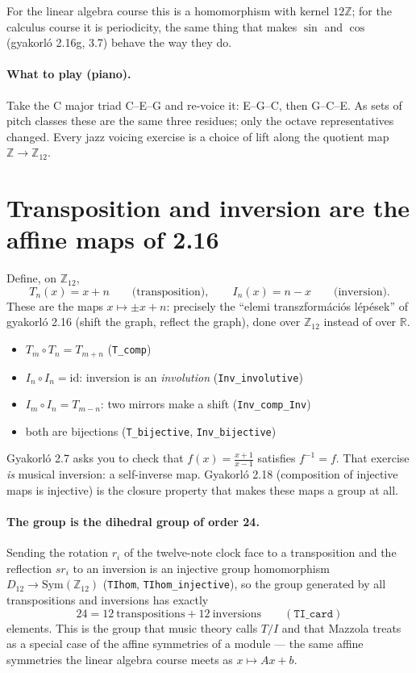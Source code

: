 \documentclass[11pt,a4paper]{article}
\newcommand{\Z}{\mathbb{Z}}
\newcommand{\R}{\mathbb{R}}
\newcommand{\Ztw}{\Z_{12}}
\newcommand{\PC}{\Z_{12}}
\newcommand{\lean}[1]{\texttt{#1}}
\begin{document}
For the linear algebra course this is a homomorphism with kernel $12\Z$; for the
calculus course it is periodicity, the same thing that makes
$\sin$ and $\cos$ (gyakorló 2.16g, 3.7) behave the way they do.

\paragraph{What to play (piano).}
Take the C major triad C--E--G and re-voice it: E--G--C, then G--C--E. As sets of
pitch classes these are the same three residues; only the octave representatives
changed. Every jazz voicing exercise is a choice of lift along the quotient map
$\Z\to\Ztw$.

\section{Transposition and inversion are the affine maps of 2.16}

Define, on $\PC$,
\[
  T_n(x)=x+n \qquad\text{(transposition)},\qquad
  I_n(x)=n-x \qquad\text{(inversion)} .
\]
These are the maps $x\mapsto \pm x + n$: precisely the ``elemi transzformációs
lépések'' of gyakorló 2.16 (shift the graph, reflect the graph), done over
$\Ztw$ instead of over $\R$.

\begin{itemize}[leftmargin=1.4em]
\item $T_m\circ T_n=T_{m+n}$ \hfill (\lean{T\_comp})
\item $I_n\circ I_n=\mathrm{id}$: inversion is an \emph{involution}
      \hfill (\lean{Inv\_involutive})
\item $I_m\circ I_n=T_{m-n}$: two mirrors make a shift \hfill (\lean{Inv\_comp\_Inv})
\item both are bijections \hfill (\lean{T\_bijective}, \lean{Inv\_bijective})
\end{itemize}

Gyakorló 2.7 asks you to check that $f(x)=\frac{x+1}{x-1}$ satisfies $f^{-1}=f$.
That exercise \emph{is} musical inversion: a self-inverse map. Gyakorló 2.18
(composition of injective maps is injective) is the closure property that makes
these maps a group at all.

\paragraph{The group is the dihedral group of order 24.}
Sending the rotation $r_i$ of the twelve-note clock face to a transposition and
the reflection $sr_i$ to an inversion is an injective group homomorphism
$D_{12}\to \mathrm{Sym}(\PC)$ (\lean{TIhom}, \lean{TIhom\_injective}), so the group
generated by all transpositions and inversions has exactly
\[
  24 = 12\ \text{transpositions} + 12\ \text{inversions}
  \qquad (\lean{TI\_card})
\]
elements. This is the group that music theory calls $T/I$ and that Mazzola treats
as a special case of the affine symmetries of a module --- the same affine
symmetries the linear algebra course meets as $x\mapsto Ax+b$.
\end{document}
